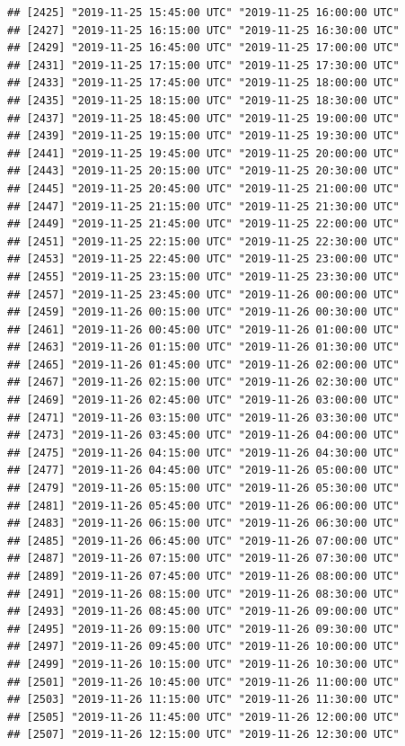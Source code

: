 \documentclass{article}\usepackage[]{graphicx}\usepackage[]{color}
\makeatletter
\newenvironment{kframe}{%
 \def\at@end@of@kframe{}%
 \ifinner\ifhmode%
  \def\at@end@of@kframe{\end{minipage}}%
  \begin{minipage}{\columnwidth}%
 \fi\fi%
 \def\FrameCommand##1{\hskip\@totalleftmargin \hskip-\fboxsep
 \colorbox{shadecolor}{##1}\hskip-\fboxsep
     \hskip-\linewidth \hskip-\@totalleftmargin \hskip\columnwidth}%
 \MakeFramed {\advance\hsize-\width
   \@totalleftmargin\z@ \linewidth\hsize
   \@setminipage}}%
 {\par\unskip\endMakeFramed%
 \at@end@of@kframe}
\newenvironment{knitrout}{}{} %
\makeatother
\begin{document}
\begin{knitrout}
\begin{kframe}
\begin{verbatim}
## [2425] "2019-11-25 15:45:00 UTC" "2019-11-25 16:00:00 UTC"
## [2427] "2019-11-25 16:15:00 UTC" "2019-11-25 16:30:00 UTC"
## [2429] "2019-11-25 16:45:00 UTC" "2019-11-25 17:00:00 UTC"
## [2431] "2019-11-25 17:15:00 UTC" "2019-11-25 17:30:00 UTC"
## [2433] "2019-11-25 17:45:00 UTC" "2019-11-25 18:00:00 UTC"
## [2435] "2019-11-25 18:15:00 UTC" "2019-11-25 18:30:00 UTC"
## [2437] "2019-11-25 18:45:00 UTC" "2019-11-25 19:00:00 UTC"
## [2439] "2019-11-25 19:15:00 UTC" "2019-11-25 19:30:00 UTC"
## [2441] "2019-11-25 19:45:00 UTC" "2019-11-25 20:00:00 UTC"
## [2443] "2019-11-25 20:15:00 UTC" "2019-11-25 20:30:00 UTC"
## [2445] "2019-11-25 20:45:00 UTC" "2019-11-25 21:00:00 UTC"
## [2447] "2019-11-25 21:15:00 UTC" "2019-11-25 21:30:00 UTC"
## [2449] "2019-11-25 21:45:00 UTC" "2019-11-25 22:00:00 UTC"
## [2451] "2019-11-25 22:15:00 UTC" "2019-11-25 22:30:00 UTC"
## [2453] "2019-11-25 22:45:00 UTC" "2019-11-25 23:00:00 UTC"
## [2455] "2019-11-25 23:15:00 UTC" "2019-11-25 23:30:00 UTC"
## [2457] "2019-11-25 23:45:00 UTC" "2019-11-26 00:00:00 UTC"
## [2459] "2019-11-26 00:15:00 UTC" "2019-11-26 00:30:00 UTC"
## [2461] "2019-11-26 00:45:00 UTC" "2019-11-26 01:00:00 UTC"
## [2463] "2019-11-26 01:15:00 UTC" "2019-11-26 01:30:00 UTC"
## [2465] "2019-11-26 01:45:00 UTC" "2019-11-26 02:00:00 UTC"
## [2467] "2019-11-26 02:15:00 UTC" "2019-11-26 02:30:00 UTC"
## [2469] "2019-11-26 02:45:00 UTC" "2019-11-26 03:00:00 UTC"
## [2471] "2019-11-26 03:15:00 UTC" "2019-11-26 03:30:00 UTC"
## [2473] "2019-11-26 03:45:00 UTC" "2019-11-26 04:00:00 UTC"
## [2475] "2019-11-26 04:15:00 UTC" "2019-11-26 04:30:00 UTC"
## [2477] "2019-11-26 04:45:00 UTC" "2019-11-26 05:00:00 UTC"
## [2479] "2019-11-26 05:15:00 UTC" "2019-11-26 05:30:00 UTC"
## [2481] "2019-11-26 05:45:00 UTC" "2019-11-26 06:00:00 UTC"
## [2483] "2019-11-26 06:15:00 UTC" "2019-11-26 06:30:00 UTC"
## [2485] "2019-11-26 06:45:00 UTC" "2019-11-26 07:00:00 UTC"
## [2487] "2019-11-26 07:15:00 UTC" "2019-11-26 07:30:00 UTC"
## [2489] "2019-11-26 07:45:00 UTC" "2019-11-26 08:00:00 UTC"
## [2491] "2019-11-26 08:15:00 UTC" "2019-11-26 08:30:00 UTC"
## [2493] "2019-11-26 08:45:00 UTC" "2019-11-26 09:00:00 UTC"
## [2495] "2019-11-26 09:15:00 UTC" "2019-11-26 09:30:00 UTC"
## [2497] "2019-11-26 09:45:00 UTC" "2019-11-26 10:00:00 UTC"
## [2499] "2019-11-26 10:15:00 UTC" "2019-11-26 10:30:00 UTC"
## [2501] "2019-11-26 10:45:00 UTC" "2019-11-26 11:00:00 UTC"
## [2503] "2019-11-26 11:15:00 UTC" "2019-11-26 11:30:00 UTC"
## [2505] "2019-11-26 11:45:00 UTC" "2019-11-26 12:00:00 UTC"
## [2507] "2019-11-26 12:15:00 UTC" "2019-11-26 12:30:00 UTC"

\end{verbatim}
\end{kframe}
\end{knitrout}
\end{document}
